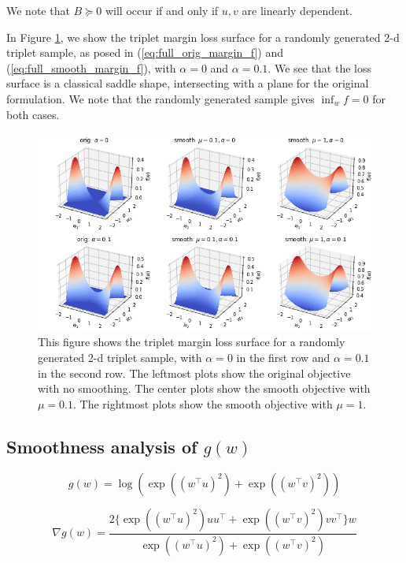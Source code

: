 \documentclass[11pt]{article}
\begin{document}
We note that $B \succeq 0$ will occur if and only if $u, v$ are linearly dependent.

In Figure \ref{fig:triplet_viz}, we show the triplet margin loss surface for a randomly generated 2-d triplet sample, as posed in (\ref{eq:full_orig_margin_f}) and (\ref{eq:full_smooth_margin_f}), with $\alpha=0$ and $\alpha=0.1$. We see that the loss surface is a classical saddle shape, intersecting with a plane for the original formulation. We note that the randomly generated sample gives $\inf_{w} f=0$ for both cases.

\begin{figure}
  \centering
  \includegraphics[width=\textwidth]{figures/triplet_viz.png}
  
  \caption{\label{fig:triplet_viz}This figure shows the triplet margin loss surface for a randomly generated 2-d triplet sample, with $\alpha = 0$ in the first row and $\alpha = 0.1$ in the second row. The leftmost plots show the original objective with no smoothing. The center plots show the smooth objective with $\mu=0.1$. The rightmost plots show the smooth objective with $\mu=1$. }
\end{figure}

\subsection{Smoothness analysis of $g(w)$}

\begin{equation}
    g(w) = \log( \exp((w^{\top}u)^2) + \exp((w^{\top}v)^2) )
\end{equation}

\begin{equation}
    \nabla g(w) 
    = \frac{ 2 \{ \exp((w^{\top}u)^2)uu^{\top} + \exp((w^{\top}v)^2)vv^{\top}  \} w}{ \exp((w^{\top}u)^2) + \exp((w^{\top}v)^2) }
\end{equation}
\end{document}
